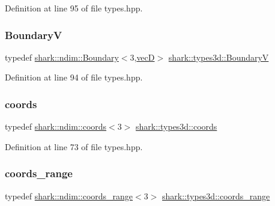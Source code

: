 Definition at line 95 of file types.\+hpp.

\hypertarget{namespaceshark_1_1types3d_a284fcada5e9b661f5c06a1ebbe013dc4}{}\label{namespaceshark_1_1types3d_a284fcada5e9b661f5c06a1ebbe013dc4} 
\subsubsection{\texorpdfstring{BoundaryV}{BoundaryV}}
{\footnotesize\ttfamily typedef \hyperlink{classshark_1_1ndim_1_1_boundary}{shark\+::ndim\+::\+Boundary}$<$3,\hyperlink{namespaceshark_1_1types3d_a2ad4ea08e8e6d62a99ffef91988c717c}{vecD}$>$ \hyperlink{namespaceshark_1_1types3d_a284fcada5e9b661f5c06a1ebbe013dc4}{shark\+::types3d\+::\+BoundaryV}}



Definition at line 94 of file types.\+hpp.

\hypertarget{namespaceshark_1_1types3d_a3a9d2663241eac116f9af8cdc794d44b}{}\label{namespaceshark_1_1types3d_a3a9d2663241eac116f9af8cdc794d44b} 
\subsubsection{\texorpdfstring{coords}{coords}}
{\footnotesize\ttfamily typedef \hyperlink{structshark_1_1ndim_1_1coords}{shark\+::ndim\+::coords}$<$3$>$ \hyperlink{namespaceshark_1_1types3d_a3a9d2663241eac116f9af8cdc794d44b}{shark\+::types3d\+::coords}}



Definition at line 73 of file types.\+hpp.

\hypertarget{namespaceshark_1_1types3d_aae18640a2350efcb3ecab3514adff75e}{}\label{namespaceshark_1_1types3d_aae18640a2350efcb3ecab3514adff75e} 
\subsubsection{\texorpdfstring{coords\+\_\+range}{coords\_range}}
{\footnotesize\ttfamily typedef \hyperlink{structshark_1_1ndim_1_1coords__range}{shark\+::ndim\+::coords\+\_\+range}$<$3$>$ \hyperlink{namespaceshark_1_1types3d_aae18640a2350efcb3ecab3514adff75e}{shark\+::types3d\+::coords\+\_\+range}}



